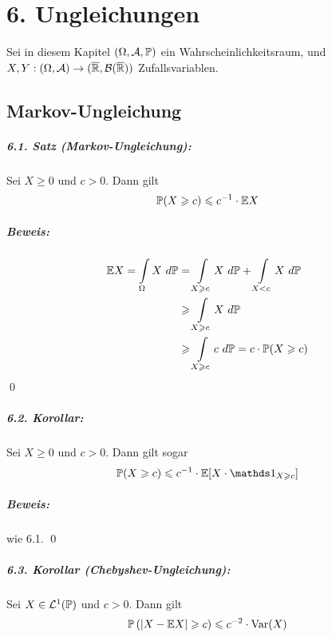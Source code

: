  \chapter*{6. Ungleichungen}

Sei in diesem Kapitel $(\Omega, \mathcal{A}, \mathbb{P})$ ein Wahrscheinlichkeitsraum, und $X,Y:(\Omega,\mathcal{A})\to(\overline{\mathbb{R}}, \mathcal{B}(\overline{\mathbb{R}}))$ Zufallsvariablen.


\section*{Markov-Ungleichung}

 
 \paragraph{6.1. Satz (Markov-Ungleichung):}Sei $X\geq0$ und $c>0$. Dann gilt
 $$\mathbb{P}(X\geqslant c)\leqslant c^{-1}\cdot\mathbb{E} X$$
 
 \paragraph{Beweis:}
 \begin{align*}
     \E X=\int\displaylimits_\Omega X\ d\Pp&=\int\displaylimits_{X\geq c}X\ d\Pp+\int\displaylimits_{X<c}X\ d\Pp\\
     &\geq\int\displaylimits_{X\geq c}X\ d\Pp\\
     &\geq \int\displaylimits_{X\geq c}c\ d\Pp=c\cdot \Pp(X\geq c)
 \end{align*}
\qed

\paragraph{6.2. Korollar:}Sei $X\geq 0$ und $c>0$. Dann gilt sogar
$$\Pp(X\geq c)\leq c^{-1}\cdot\E[X\cdot\ind{X\geq c}]$$

\paragraph{Beweis:}wie 6.1. \qed

\paragraph{6.3. Korollar (Chebyshev-Ungleichung):}Sei $X\in\mathcal{L}^1(\mathbb{P})$ und $c>0$. Dann gilt
$$\mathbb{P}\left(|X-\mathbb{E} X|\geqslant c\right)\leqslant c^{-2}\cdot\operatorname{Var}(X)$$
 
